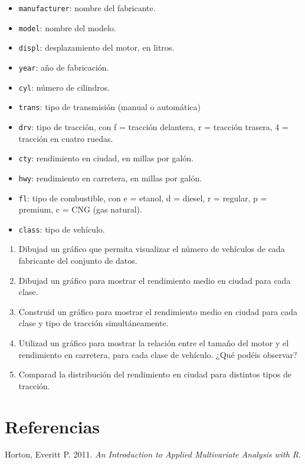 \documentclass[
  letterpaper,
  DIV=11,
  numbers=noendperiod]{scrreprt}
\newlength{\cslhangindent}
\newenvironment{CSLReferences}[2] %
 {\begin{list}{}{%
  \setlength{\itemindent}{0pt}
  \setlength{\leftmargin}{0pt}
  \setlength{\parsep}{0pt}
  \ifodd #1
   \setlength{\leftmargin}{\cslhangindent}
   \setlength{\itemindent}{-1\cslhangindent}
  \fi
  \setlength{\itemsep}{#2\baselineskip}}}
 {\end{list}}
\begin{document}
\begin{itemize}
\item
  \texttt{manufacturer}: nombre del fabricante.
\item
  \texttt{model}: nombre del modelo.
\item
  \texttt{displ}: desplazamiento del motor, en litros.
\item
  \texttt{year}: año de fabricación.
\item
  \texttt{cyl}: número de cilindros.
\item
  \texttt{trans}: tipo de transmisión (manual o automática)
\item
  \texttt{drv}: tipo de tracción, con f = tracción delantera, r =
  tracción trasera, 4 = tracción en cuatro ruedas.
\item
  \texttt{cty}: rendimiento en ciudad, en millas por galón.
\item
  \texttt{hwy}: rendimiento en carretera, en millas por galón.
\item
  \texttt{fl}: tipo de combustible, con e = etanol, d = diesel, r =
  regular, p = premium, c = CNG (gas natural).
\item
  \texttt{class}: tipo de vehículo.
\end{itemize}

\begin{enumerate}
\def\labelenumi{\arabic{enumi}.}
\item
  Dibujad un gráfico que permita visualizar el número de vehículos de
  cada fabricante del conjunto de datos.
\item
  Dibujad un gráfico para mostrar el rendimiento medio en ciudad para
  cada clase.
\item
  Construid un gráfico para mostrar el rendimiento medio en ciudad para
  cada clase y tipo de tracción simultáneamente.
\item
  Utilizad un gráfico para mostrar la relación entre el tamaño del motor
  y el rendimiento en carretera, para cada clase de vehículo. ¿Qué
  podéis observar?
\item
  Comparad la distribución del rendimiento en ciudad para distintos
  tipos de tracción.
\end{enumerate}


\chapter*{Referencias}\label{referencias}


\label{refs}
\begin{CSLReferences}{1}{0}
Horton, Everitt P. 2011. \emph{An Introduction to Applied Multivariate
Analysis with R}.

\end{CSLReferences}
\end{document}
